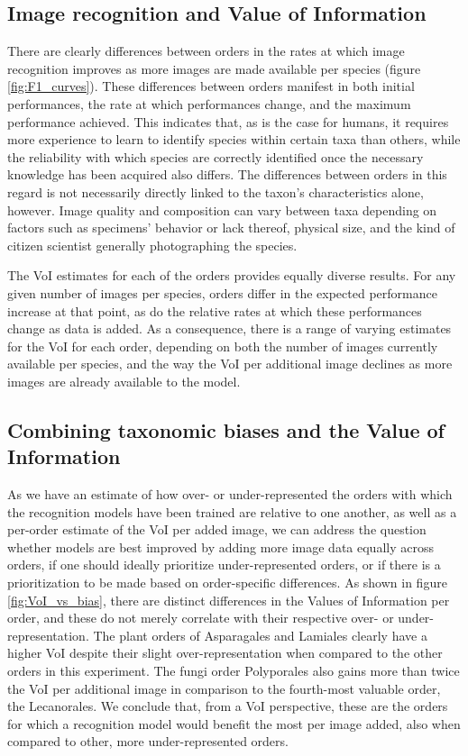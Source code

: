\documentclass{article}
\begin{document}
\subsection*{Image recognition and Value of Information}
There are clearly differences between orders in the rates at which image recognition improves as more images are made available per species (figure \ref{fig:F1_curves}). These differences between orders manifest in both initial performances, the rate at which performances change, and the maximum performance achieved. This indicates that, as is the case for humans, it requires more experience to learn to identify species within certain taxa than others, while the reliability with which species are correctly identified once the necessary knowledge has been acquired also differs. The differences between orders in this regard is not necessarily directly linked to the taxon's characteristics alone, however. Image quality and composition can vary between taxa depending on factors such as specimens' behavior or lack thereof, physical size, and the kind of citizen scientist generally photographing the species.

The VoI estimates for each of the orders provides equally diverse results. For any given number of images per species, orders differ in the expected performance increase at that point, as do the relative rates at which these performances change as data is added. As a consequence, there is a range of varying estimates for the VoI for each order, depending on both the number of images currently available per species, and the way the VoI per additional image declines as more images are already available to the model.

\subsection*{Combining taxonomic biases and the Value of Information}
As we have an estimate of how over- or under-represented the orders with which the recognition models have been trained are relative to one another, as well as a per-order estimate of the VoI per added image, we can address the question whether models are best improved by adding more image data equally across orders, if one should ideally prioritize under-represented orders, or if there is a prioritization to be made based on order-specific differences. As shown in figure \ref{fig:VoI_vs_bias}, there are distinct differences in the Values of Information per order, and these do not merely correlate with their respective over- or under-representation. The plant orders of Asparagales and Lamiales clearly have a higher VoI despite their slight over-representation when compared to the other orders in this experiment. The fungi order Polyporales also gains more than twice the VoI per additional image in comparison to the fourth-most valuable order, the Lecanorales. We conclude that, from a VoI perspective, these are the orders for which a recognition model would benefit the most per image added, also when compared to other, more under-represented orders.
\end{document}
